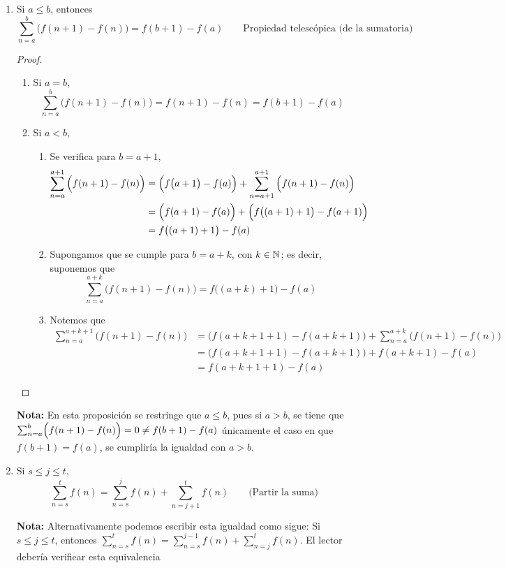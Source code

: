 \begin{enumerate}[label=\alph*)]
  \item Si $a\leq b$, entonces \[\sum_{n=a}^{b} \Big(f(n+1)-f(n)\Big) = f(b+1) - f(a) \qquad \text{Propiedad telescópica (de la sumatoria)}\]
  \begin{proof}\leavevmode
    \begin{enumerate}[label=\Roman*)]
      \item Si $a=b$, \[\sum_{n=a}^{b} \Big(f(n+1)-f(n)\Big) = f(n+1) - f(n) = f(b+1) - f(a)\]
      \item Si $a<b$,
      \begin{enumerate}[label=\roman*)]
        \item Se verifica para $b=a+1$,
        \begin{align*}
          \sum_{n=a}^{a+1} \Big(f(n+1)-f(n)\Big) &= \Bigl(f\big(a+1\big)-f(a)\Bigr) + \sum_{n=a+1}^{a+1} \Big(f(n+1)-f(n)\Big)\\
          &= \Bigl(f(a+1)-f(a)\Bigr) + \Bigl(f\big((a+1)+1\big)-f(a+1)\Bigr)\\
          &= f\bigl((a+1)+1\bigr) - f(a)
        \end{align*}
        \item Supongamos que se cumple para $b=a+k$, con $k\in \mathbb{N}$; es decir, suponemos que
        \[\sum_{n=a}^{a+k} \Big(f(n+1)-f(n)\Big) = f\bigl((a+k)+1\bigr) - f(a)\]
        \item Notemos que
        \begin{align*}
          \sum_{n=a}^{a+k+1} \Big(f(n+1)-f(n)\Big) &= \Big(f(a+k+1+1)-f(a+k+1)\Big) + \sum_{n=a}^{a+k} \Big(f(n+1)-f(n)\Big)\\
          &= \Big(f(a+k+1+1)-f(a+k+1)\Big) + f(a+k+1) - f(a)\\
          &= f(a+k+1+1) - f(a)
        \end{align*}
      \end{enumerate}
    \end{enumerate}
  \end{proof}
  \textbf{Nota:} En esta proposición se restringe que $a\leq b$, pues si $a>b$, se tiene que $\sum_{n=a}^{b} \Bigl(f(n+1)-f(n)\Bigr) = 0 \neq f(b+1) - f(a)$ únicamente el caso en que $f(b+1)=f(a)$, se cumpliría la igualdad con $a>b$.
  
  \item Si $s\leq j\leq t$, \[\sum_{n=s}^{t}f(n) = \sum_{n=s}^{j}f(n) + \sum_{n=j+1}^{t}f(n) \qquad \text{(Partir la suma)}\]
  
  \textbf{Nota:} Alternativamente podemos escribir esta igualdad como sigue: Si $s\leq j\leq t$, entonces $\sum_{n=s}^{t}f(n) = \sum_{n=s}^{j-1}f(n) + \sum_{n=j}^{t}f(n)$. El lector debería verificar esta equivalencia


\end{enumerate}
